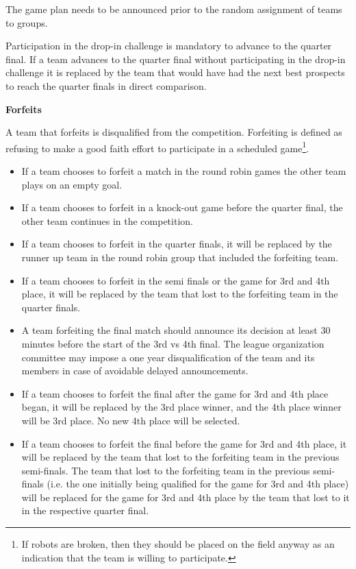 \bigskip


The game plan needs to be announced prior to the random assignment of teams to groups.


\bigskip

Participation in the drop-in challenge is mandatory to advance to the quarter final. If a team advances to the quarter final without participating in the drop-in challenge it is replaced by the team that would have had the next best prospects to reach the quarter finals in direct comparison.

\bigskip

{\bfseries Forfeits}

\headlinebox

A team that forfeits is disqualified from the competition. Forfeiting is defined as refusing to make a good faith effort to participate in a scheduled game\footnote{If robots are broken, then they should be placed on the field anyway as an indication that the team is willing to participate.}.
\begin{itemize}
\item If a team chooses to forfeit a match in the round robin games the other team plays on an empty goal.
\item If a team chooses to forfeit in a knock-out game before the quarter final, the other team continues in the competition.
\item If a team chooses to forfeit in the quarter finals, it will be replaced by the runner up team in the round robin group that included the forfeiting team.
\item If a team chooses to forfeit in the semi finals or the game for 3rd and 4th place, it will be replaced by the team that lost to the forfeiting team in the quarter finals.
\item A team forfeiting the final match should announce its decision at least 30 minutes before the start of the 3rd vs 4th final.  The league organization committee may impose a one year disqualification of the team and its members in case of avoidable delayed announcements.
\item If a team chooses to forfeit the final after the game for 3rd and 4th place began, it will be replaced by the 3rd place winner, and the 4th place winner will be 3rd place. No new 4th place will be selected.
\item If a team chooses to forfeit the final before the game for 3rd and 4th place, it will be replaced by the team that lost to the forfeiting team in the previous semi-finals. The team that lost to the forfeiting team in the previous semi-finals (i.e. the one initially being qualified for the game for 3rd and 4th place) will be replaced for the game for 3rd and 4th place by the team that lost to it in the respective quarter final.
\end{itemize}

